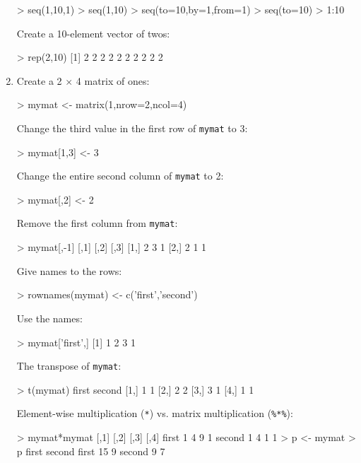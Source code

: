 \begin{enumerate}
\begin{console}
> seq(1,10,1)
> seq(1,10)
> seq(to=10,by=1,from=1)
> seq(to=10)
> 1:10
\end{console}

Create a 10-element vector of twos:

\begin{console}
> rep(2,10)
 [1] 2 2 2 2 2 2 2 2 2 2
\end{console}

\item Create a 2 $\times$ 4 matrix of ones:

\begin{console}
> mymat <- matrix(1,nrow=2,ncol=4)
\end{console}

Change the third value in the first row of \texttt{mymat} to 3:

\begin{console}
> mymat[1,3] <- 3
\end{console}

Change the entire second column of \texttt{mymat} to 2:

\begin{console}
> mymat[,2] <- 2
\end{console}

Remove the first column from \texttt{mymat}:

\begin{console}
> mymat[,-1]
     [,1] [,2] [,3]
[1,]    2    3    1
[2,]    2    1    1
\end{console}

Give names to the rows:

\begin{console}
> rownames(mymat) <- c('first','second')
\end{console}

Use the names:

\begin{console}
> mymat['first',]
[1] 1 2 3 1
\end{console}

The transpose of \texttt{mymat}:

\begin{console}
> t(mymat)
     first second
[1,]    1    1
[2,]    2    2
[3,]    3    1
[4,]    1    1
\end{console}

Element-wise multiplication (\verb|*|) vs. matrix multiplication
(\verb|%*%|):

\begin{console}
> mymat*mymat
       [,1] [,2] [,3] [,4]
first     1    4    9    1
second    1    4    1    1
> p <- mymat %
> p
       first second
first     15      9
second     9      7
\end{console}  


\end{enumerate}
